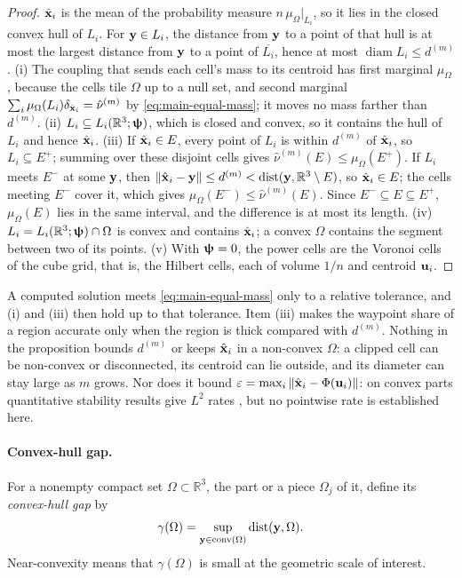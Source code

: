 \begin{proof}
  $\hat {\bm{\mathrm{x}}}_i$ is the mean of the probability measure $n\,\mu_\Omega|_{L_i}$, so it lies in the closed convex hull of $L_i$. For ${\bm{\mathrm{y}}}\in L_i$, the distance from ${\bm{\mathrm{y}}}$ to a point of that hull is at most the largest distance from ${\bm{\mathrm{y}}}$ to a point of $\overline{L_i}$, hence at most $\operatorname{diam}L_i\leq d^{(m)}$. (i) The coupling that sends each cell's mass to its centroid has first marginal $\mu_\Omega$, because the cells tile $\Omega$ up to a null set, and second marginal $\sum_i\mu_\Omega(L_i)\delta_{\hat {\bm{\mathrm{x}}}_i}=\hat\nu^{(m)}$ by \eqref{eq:main-equal-mass}; it moves no mass farther than $d^{(m)}$. (ii) $L_i\subseteq L_i(\mathbb R^3;{\bm{\mathrm{\uppsi}}})$, which is closed and convex, so it contains the hull of $L_i$ and hence $\hat {\bm{\mathrm{x}}}_i$. (iii) If $\hat {\bm{\mathrm{x}}}_i\in E$, every point of $L_i$ is within $d^{(m)}$ of $\hat {\bm{\mathrm{x}}}_i$, so $L_i\subseteq E^{+}$; summing over these disjoint cells gives $\hat\nu^{(m)}(E)\leq\mu_\Omega(E^{+})$. If $L_i$ meets $E^{-}$ at some ${\bm{\mathrm{y}}}$, then $\|\hat {\bm{\mathrm{x}}}_i-{\bm{\mathrm{y}}}\|\leq d^{(m)}<\operatorname{dist}({\bm{\mathrm{y}}},\mathbb R^3\setminus E)$, so $\hat {\bm{\mathrm{x}}}_i\in E$; the cells meeting $E^{-}$ cover it, which gives $\mu_\Omega(E^{-})\leq\hat\nu^{(m)}(E)$. Since $E^{-}\subseteq E\subseteq E^{+}$, $\mu_\Omega(E)$ lies in the same interval, and the difference is at most its length. (iv) $L_i=L_i(\mathbb R^3;{\bm{\mathrm{\uppsi}}})\cap\Omega$ is convex and contains $\hat {\bm{\mathrm{x}}}_i$; a convex $\Omega$ contains the segment between two of its points. (v) With ${\bm{\mathrm{\uppsi}}}=0$, the power cells are the Voronoi cells of the cube grid, that is, the Hilbert cells, each of volume $1/n$ and centroid ${\bm{\mathrm{u}}}_i$.
\end{proof}
A computed solution meets \eqref{eq:main-equal-mass} only to a relative tolerance, and (i) and (iii) then hold up to that tolerance. Item (iii) makes the waypoint share of a region accurate only when the region is thick compared with $d^{(m)}$. Nothing in the proposition bounds $d^{(m)}$ or keeps $\hat {\bm{\mathrm{x}}}_i$ in a non-convex $\Omega$: a clipped cell can be non-convex or disconnected, its centroid can lie outside, and its diameter can stay large as $m$ grows. Nor does it bound $\varepsilon=\max_i\|\hat {\bm{\mathrm{x}}}_i-\Phi({\bm{\mathrm{u}}}_i)\|$: on convex parts quantitative stability results give $L^2$ rates \cite{merigot2020quantitative}, but no pointwise rate is established here.

\paragraph{Convex-hull gap.}
\label{sec:vsfc-hull-gap}
For a nonempty compact set $\Omega\subset\mathbb R^3$, the part or a piece $\Omega_j$ of it, define its \emph{convex-hull gap} by
\begin{equation}
  \label{eq:vsfc-hull-gap}
  \gamma(\Omega)=\sup_{{\bm{\mathrm{y}}}\in\operatorname{conv}(\Omega)}\operatorname{dist}({\bm{\mathrm{y}}},\Omega).
\end{equation}
Near-convexity means that $\gamma(\Omega)$ is small at the geometric scale of interest.

